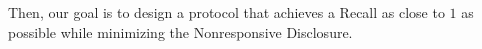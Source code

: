Then, our goal is to design a protocol that achieves a Recall as close to $1$ as possible while minimizing the Nonresponsive Disclosure.








